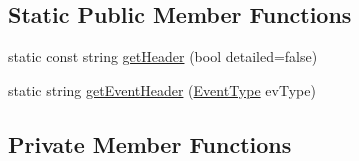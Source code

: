 \subsection*{Static Public Member Functions}
\begin{DoxyCompactItemize}
\item 
static const string \hyperlink{class_antenna_a9d56406fd66fc0835c373ea342dee7af}{get\+Header} (bool detailed=false)
\item 
static string \hyperlink{class_antenna_aef8e1cda793839c25ccee7888db37943}{get\+Event\+Header} (\hyperlink{_event_type_8h_a2628ea8d12e8b2563c32f05dc7fff6fa}{Event\+Type} ev\+Type)
\end{DoxyCompactItemize}
\subsection*{Private Member Functions}
